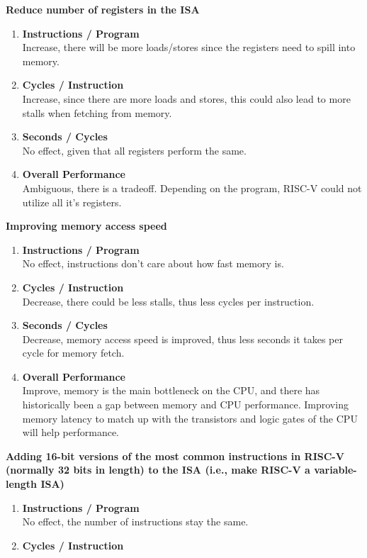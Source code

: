 \documentclass[11pt]{article}
\begin{document}
\begin{Parts}
	\Part \textbf{Reduce number of registers in the ISA}
	\begin{enumerate}[i]
		\item \textbf{Instructions / Program} \\
		      Increase, there will be more loads/stores since the registers need to spill into memory.
		\item \textbf{Cycles / Instruction} \\
		      Increase, since there are more loads and stores, this could also lead to more stalls when fetching from memory.
		\item \textbf{Seconds / Cycles} \\
		      No effect, given that all registers perform the same.
		\item \textbf{Overall Performance} \\
		      Ambiguous, there is a tradeoff. Depending on the program, RISC-V could not utilize all it's registers.
	\end{enumerate}
	\Part \textbf{Improving memory access speed}
	\begin{enumerate}[i]
		\item \textbf{Instructions / Program} \\
		      No effect, instructions don't care about how fast memory is.
		\item \textbf{Cycles / Instruction} \\
		      Decrease, there could be less stalls, thus less cycles per instruction.
		\item \textbf{Seconds / Cycles} \\
		      Decrease, memory access speed is improved, thus less seconds it takes per cycle for memory fetch.
		\item \textbf{Overall Performance} \\
		      Improve, memory is the main bottleneck on the CPU, and there has historically been a gap between memory and CPU performance. Improving memory latency to match up with the transistors and logic gates of the CPU will help performance.
	\end{enumerate}
	\Part \textbf{Adding 16-bit versions of the most common instructions in RISC-V (normally 32 bits in length) to the ISA (i.e., make RISC-V a variable-length ISA)}
	\begin{enumerate}[i]
		\item \textbf{Instructions / Program} \\
		      No effect, the number of instructions stay the same.
		\item \textbf{Cycles / Instruction} \\

\end{enumerate}
\end{Parts}
\end{document}

